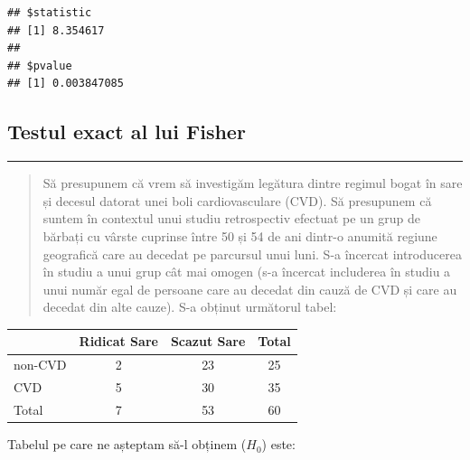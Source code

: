 \documentclass[]{article}
\begin{document}
\begin{verbatim}
## $statistic
## [1] 8.354617
## 
## $pvalue
## [1] 0.003847085
\end{verbatim}

\subsection{Testul exact al lui
Fisher}\label{testul-exact-al-lui-fisher}

\begin{center}\rule{0.5\linewidth}{\linethickness}\end{center}

\begin{quote}
Să presupunem că vrem să investigăm legătura dintre regimul bogat în
sare și decesul datorat unei boli cardiovasculare (CVD). Să presupunem
că suntem în contextul unui studiu retrospectiv efectuat pe un grup de
bărbați cu vârste cuprinse între 50 și 54 de ani dintr-o anumită regiune
geografică care au decedat pe parcursul unui luni. S-a încercat
introducerea în studiu a unui grup cât mai omogen (s-a încercat
includerea în studiu a unui număr egal de persoane care au decedat din
cauză de CVD și care au decedat din alte cauze). S-a obținut următorul
tabel:
\end{quote}

\begin{longtable}[]{@{}lccc@{}}
\toprule
& Ridicat Sare & Scazut Sare & Total\tabularnewline
\midrule
\endhead
non-CVD & 2 & 23 & 25\tabularnewline
CVD & 5 & 30 & 35\tabularnewline
Total & 7 & 53 & 60\tabularnewline
\bottomrule
\end{longtable}

Tabelul pe care ne așteptam să-l obținem (\(H_0\)) este:
\end{document}
